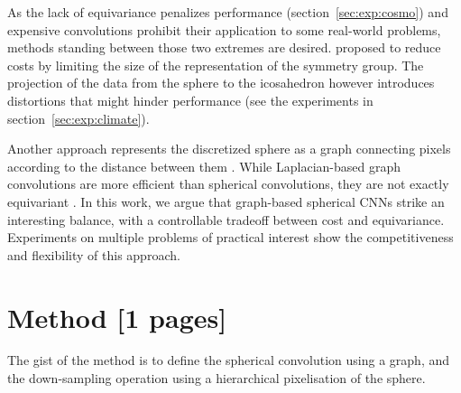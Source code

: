\documentclass{article} %
\newcommand{\todo}[1]{{\color[rgb]{.6,.1,.6}{#1}}}
\renewcommand{\secref}[1]{section~\ref{sec:#1}}
\begin{document}
As the lack of equivariance penalizes performance (\secref{exp:cosmo}) and expensive convolutions prohibit their application to some real-world problems, methods standing between those two extremes are desired.
\citet{cohen2019gauge} proposed to reduce costs by limiting the size of the representation of the symmetry group.
\todo{not all rotations, subset of SO(3)?}
The projection of the data from the sphere to the icosahedron however introduces distortions that might hinder performance (see the experiments in \secref{exp:climate}).
\todo{Where does Jiang fit? Need a global coordinate system (ok for planets, not projections like cosmo)}

Another approach represents the discretized sphere as a graph connecting pixels according to the distance between them \citep{khasanova2017sphericalcnn, perraudin2019deepspherecosmo}.
While Laplacian-based graph convolutions are more efficient than spherical convolutions, they are not exactly equivariant \citep{defferrard2019deepsphereequiv}.
In this work, we argue that graph-based spherical CNNs strike an interesting balance, with a controllable tradeoff between cost and equivariance.
Experiments on multiple problems of practical interest show the competitiveness and flexibility of this approach.

\section{Method [1 pages]}

The gist of the method is to define the spherical convolution using a graph, and the down-sampling operation using a hierarchical pixelisation of the sphere.

\todo{
	* discuss discretizations (equiangular, HEALPix) -> more uniform is better \\
	* no uniform sampling: tradeoffs have to be made \\
	* CNN vs FCN discussion (GAP for invariance) \\
}
\end{document}
